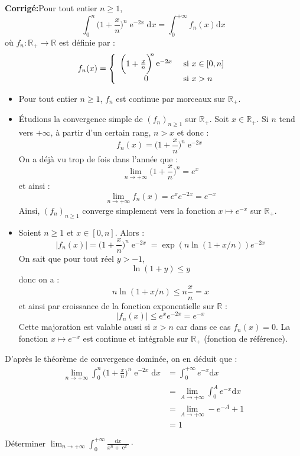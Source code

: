 \documentclass[a4paper,twoside,french,10pt]{VcCours}
\newcommand{\dx}{\text{d}x}
\DeclareMathOperator{\e}{e}
\newcommand{\corr}{\textbf{Corrigé:}}
\begin{document}
\corr Pour tout entier $n \geq 1$,
$$ \int_{0}^{n} \biggl( 1 + \frac{x}{n} \biggr)^{\!\!n} \e^{ - 2x} \dx = \int_0^{+ \infty} f_n(x) \dx$$
où $f_n : \mathbb{R}_+ \rightarrow  \mathbb{R}$ est définie par :
$$ f_n(x) = \left\lbrace \begin{array}{cl}
\biggl( 1 + \frac{x}{n} \biggr)^{\!\!n} \e^{ - 2x} & \hbox{ si } x \in [0,n] \\
0 & \hbox{ si } x>n
\end{array}\right.$$
\begin{itemize}
\item Pour tout entier $n \geq 1$, $f_n$ est continue par morceaux sur $\mathbb{R}_+$.
\item Étudions la convergence simple de $(f_n)_{n \geq 1}$ sur $\mathbb{R}_+$. Soit $x \in \mathbb{R}_+$. Si $n$ tend vers $+ \infty$, à partir d'un certain rang, $n>x$ et donc :
$$ f_n(x) = \biggl( 1 + \frac{x}{n} \biggr)^{\!\!n} \e^{ - 2x}$$
On a déjà vu trop de fois dans l'année que :
$$ \lim_{n \rightarrow + \infty} \biggl( 1 + \frac{x}{n} \biggr)^{\!\!n} = e^x$$
et ainsi :
$$ \lim_{n \rightarrow + \infty} f_n(x) =e^x e^{-2x} = e^{-x}$$
Ainsi, $(f_n)_{n \geq 1}$ converge simplement vers la fonction $x \mapsto e^{-x}$ sur $\mathbb{R}_+$.
\item Soient $n \geq 1$ et $x \in [0,n]$. Alors :
$$ \vert f_n(x) \vert = \biggl( 1 + \frac{x}{n} \biggr)^{\!\!n} \e^{ - 2x} = \exp(n \ln(1+x/n)) e^{-2x}$$
On sait que pour tout réel $y>-1$,
$$ \ln(1+y) \leq y$$
donc on a :
$$ n \ln(1+x/n) \leq n\dfrac{x}{n} = x$$
et ainsi par croissance de la fonction exponentielle sur $\mathbb{R}$ :
$$ \vert f_n(x) \vert  \leq e^{x} e^{-2x} = e^{-x}$$
Cette majoration est valable aussi si $x>n$ car dans ce cas $f_n(x)=0$. La fonction $x \mapsto e^{-x}$ est continue et intégrable sur $\mathbb{R}_+$ (fonction de référence).
\end{itemize}
D'après le théorème de convergence dominée, on en déduit que :
\begin{align*}
\lim_{n \to + \infty} \int_{0}^{n} \biggl( 1 + \frac{x}{n} \biggr)^{\!\!n} \e^{ - 2x} \dx & = \int_0^{+ \infty} e^{-x} \dx \\
& = \lim_{A \rightarrow + \infty} \int_0^A e^{-x} \dx \\
&  = \lim_{A \rightarrow + \infty} -e^{-A}+1 \\
& = 1
\end{align*}


 \begin{Exercice}{} Déterminer $\lim_{n \rightarrow + \infty} \int_{0}^{ + \infty} \frac{\dx}{x^{n} + \e^{x}} \cdot$
 \end{Exercice}
 
\end{document}
